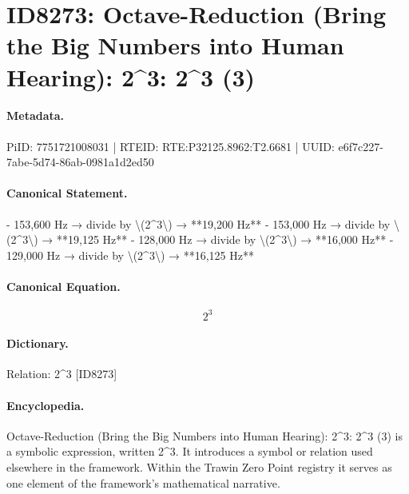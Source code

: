 \section*{ID8273: Octave-Reduction (Bring the Big Numbers into Human Hearing): 2\textasciicircum{}3: 2\textasciicircum{}3 (3)}
\paragraph{Metadata.}
PiID: 7751721008031 | RTEID: RTE:P32125.8962:T2.6681 | UUID: e6f7c227-7abe-5d74-86ab-0981a1d2ed50

\paragraph{Canonical Statement.}
- 153,600 Hz → divide by \textbackslash{}(2\textasciicircum{}3\textbackslash{}) → **19,200 Hz** - 153,000 Hz → divide by \textbackslash{}(2\textasciicircum{}3\textbackslash{}) → **19,125 Hz** - 128,000 Hz → divide by \textbackslash{}(2\textasciicircum{}3\textbackslash{}) → **16,000 Hz** - 129,000 Hz → divide by \textbackslash{}(2\textasciicircum{}3\textbackslash{}) → **16,125 Hz**

\paragraph{Canonical Equation.}
\[
2^3
\]

\paragraph{Dictionary.}
Relation: 2\textasciicircum{}3 [ID8273]

\paragraph{Encyclopedia.}
Octave-Reduction (Bring the Big Numbers into Human Hearing): 2\textasciicircum{}3: 2\textasciicircum{}3 (3) is a symbolic expression, written 2\textasciicircum{}3. It introduces a symbol or relation used elsewhere in the framework. Within the Trawin Zero Point registry it serves as one element of the framework's mathematical narrative.
